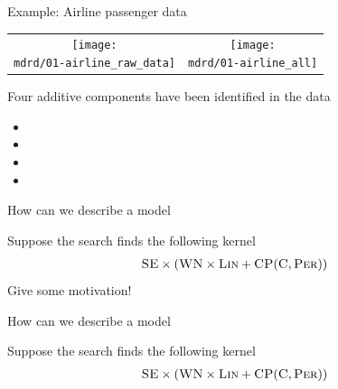 \begin{frame}{Example: Airline passenger data}

\newcommand{\wmgd}{0.5\columnwidth}
\newcommand{\hmgd}{3.0cm}
\newcommand{\mdrd}{figures/01-airline}
\newcommand{\mbm}{\hspace{-0.3cm}}
\begin{tabular}{cc}
\mbm \texttt{[image: \\mdrd/01-airline\_raw\_data]} & \texttt{[image: \\mdrd/01-airline\_all]}
\end{tabular}
\vspace{0.5\baselineskip}

{\scriptsize
Four additive components have been identified in the data
\begin{itemize}

  \item  

  \item  

  \item  

  \item  

\end{itemize}
}
\end{frame}

\begin{frame}{How can we describe a model}
  \begin{center}
  Suppose the search finds the following kernel
  \begin{align*}
    {\textsc{SE}} \times ({\textsc{WN}} \times {\textsc{Lin}} + {\textsc{CP}}({\textsc{C}}, {\textsc{Per}}))
  \end{align*}
  Give some motivation!
  \end{center}
\end{frame}

\begin{frame}{How can we describe a model}
  \begin{center}
  Suppose the search finds the following kernel
  \begin{align*}
    {\textsc{SE}} \times ({\textsc{WN}} \times {\textsc{Lin}} + {\textsc{CP}}({\textsc{C}}, {\textsc{Per}}))
  \end{align*}
  \end{center}
\end{frame}

